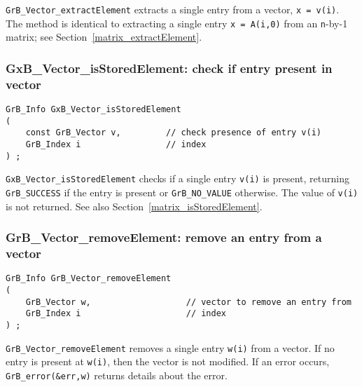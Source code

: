 \documentclass[12pt]{article}
\begin{document}
\verb'GrB_Vector_extractElement' extracts a single entry from a vector,
\verb'x = v(i)'.  The method is identical to extracting a single entry
\verb'x = A(i,0)' from an \verb'n'-by-1 matrix; see
Section~\ref{matrix_extractElement}.

\subsubsection{{\sf GxB\_Vector\_isStoredElement:} check if entry present in vector}
\label{vector_isStoredElement}

\begin{mdframed}[userdefinedwidth=6in]
{\footnotesize
\begin{verbatim}
GrB_Info GxB_Vector_isStoredElement
(
    const GrB_Vector v,         // check presence of entry v(i)
    GrB_Index i                 // index
) ;
\end{verbatim} } \end{mdframed}

\verb'GxB_Vector_isStoredElement' checks if a single entry \verb'v(i)'
is present, returning \verb'GrB_SUCCESS' if the entry is present or
\verb'GrB_NO_VALUE' otherwise.  The value of \verb'v(i)' is not returned.
See also Section~\ref{matrix_isStoredElement}.

\subsubsection{{\sf GrB\_Vector\_removeElement:} remove an entry from a vector}
\label{vector_removeElement}

\begin{mdframed}[userdefinedwidth=6in]
{\footnotesize
\begin{verbatim}
GrB_Info GrB_Vector_removeElement
(
    GrB_Vector w,                   // vector to remove an entry from
    GrB_Index i                     // index
) ;
\end{verbatim} } \end{mdframed}

\verb'GrB_Vector_removeElement' removes a single entry \verb'w(i)' from a vector.
If no entry is present at \verb'w(i)', then the vector is not modified.
If an error occurs, \verb'GrB_error(&err,w)' returns details about the error.
\end{document}
